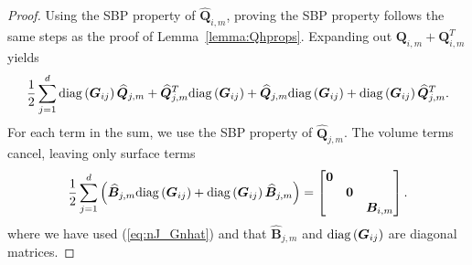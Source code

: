 \documentclass{svjour3}                     %
\renewcommand{\hat}{\widehat}
\newcommand{\diag}[1]{{\rm diag}\LRp{#1}}
\newcommand{\LRp}[1]{\left( #1 \right)}
\newcommand{\LRs}[1]{\left[ #1 \right]}
\begin{document}
\begin{proof}
Using the SBP property of $\hat{\bm{Q}}_{i,m}$, proving the SBP property follows the same steps as the proof of Lemma~\ref{lemma:Qhprops}.  
Expanding out $\bm{Q}_{i,m} + \bm{Q}_{i,m}^T$ yields
\[
\frac{1}{2}\sum_{j=1}^d \diag{\bm{G}_{ij}}\hat{\bm{Q}}_{j,m} + \hat{\bm{Q}}_{j,m}^T\diag{\bm{G}_{ij}} + \hat{\bm{Q}}_{j,m} \diag{\bm{G}_{ij}} +  \diag{\bm{G}_{ij}}\hat{\bm{Q}}_{j,m}^T.
\]
For each term in the sum, we use the SBP property of $\hat{\bm{Q}}_{j,m}$.  The volume terms cancel, leaving only surface terms
\[
\frac{1}{2}\sum_{j=1}^d \LRp{\hat{\bm{B}}_{j,m}\diag{\bm{G}_{ij}} +  \diag{\bm{G}_{ij}}\hat{\bm{B}}_{j,m}} = \begin{bmatrix}
\bm{0} & &\\
& \bm{0} &\\
& & \bm{B}_{i,m} \end{bmatrix}.
\]
where we have used (\ref{eq:nJ_Gnhat}) and that $\hat{\bm{B}}_{j,m}$ and $\diag{\bm{G}_{ij}}$ are diagonal matrices.  



\end{proof}
\end{document}
